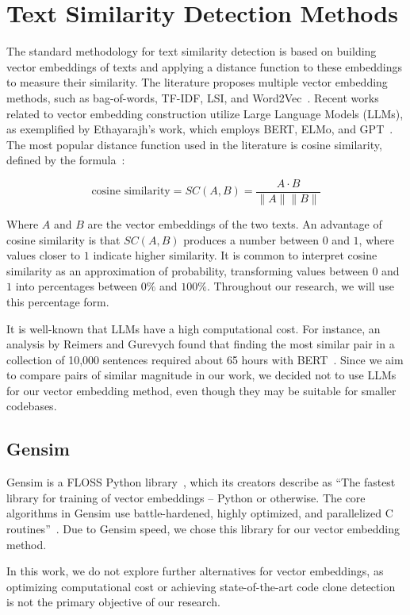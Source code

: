 \en

\section{Text Similarity Detection Methods}
\label{sec:similarity}

The standard methodology for text similarity detection is based on building
vector embeddings of texts and applying a distance function to these embeddings
to measure their similarity. The literature proposes multiple vector
embedding methods, such as bag-of-words, TF-IDF, LSI, and
Word2Vec~\citep{gensimlivro}. Recent works related to vector embedding construction
utilize Large Language Models (LLMs), as exemplified by Ethayarajh's work,
which employs BERT, ELMo, and GPT~\citep{llmsimilar}. The most popular distance
function used in the literature is cosine similarity, defined by the formula~\citep{cosineref}:

$$\text{cosine similarity} = SC(A,B) = \frac{ A \cdot B}{ \lVert A \rVert \lVert B \rVert }$$

Where $A$ and $B$ are the vector embeddings of the two texts. An advantage of
cosine similarity is that $SC(A,B)$ produces a number between $0$ and $1$,
where values closer to $1$ indicate higher similarity. It is common to
interpret cosine similarity as an approximation of probability, transforming
values between $0$ and $1$ into percentages between $0\%$ and $100\%$.
Throughout our research, we will use this percentage form.

It is well-known that LLMs have a high computational cost. For instance, an
analysis by Reimers and Gurevych found that finding the most similar pair in a
collection of 10,000 sentences required about 65 hours with
BERT~\citep{bertsimilar}. Since we aim to compare pairs of similar magnitude in
our work, we decided not to use LLMs for our vector embedding method, even
though they may be suitable for smaller codebases.

\subsection{Gensim}

Gensim is a FLOSS Python library~\citep{gensim}, which its creators
describe as ``The fastest library for training of vector embeddings -- Python or
otherwise. The core algorithms in Gensim use battle-hardened, highly optimized,
and parallelized C routines''~\citep{gensimsite}. Due to Gensim speed, we
chose this library for our vector embedding method.

In this work, we do not explore further alternatives for vector embeddings, as
optimizing computational cost or achieving state-of-the-art code clone
detection is not the primary objective of our research.
